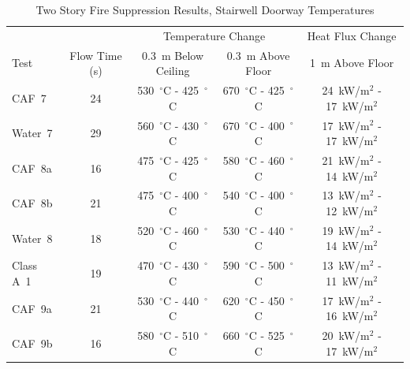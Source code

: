 \documentclass[12pt,oneside]{book}
\begin{document}
\begin{table}[!ht]
\centering
\caption{Two Story Fire Suppression Results, Stairwell Doorway Temperatures}\label{tab:Test_Results_2}
\begin{tabular}{lcccc}
\toprule[1.5pt]
           &               & \multicolumn{2}{c}{Temperature Change}                                    & Heat Flux Change \\
Test 	   & Flow Time (s) & 0.3~m Below Ceiling                 & 0.3~m Above Floor	               & 1~m Above Floor \\
\midrule
CAF~7      & 24            & 530~$^{\circ}$C - 425~$^{\circ}$C   & 670~$^{\circ}$C - 425~$^{\circ}$C   & 24~kW/m$^2$ - 17~kW/m$^2$  \\[.25cm]
Water~7    & 29            & 560~$^{\circ}$C - 430~$^{\circ}$C   & 670~$^{\circ}$C - 400~$^{\circ}$C   & 17~kW/m$^2$ - 17~kW/m$^2$  \\[.25cm]
CAF~8a     & 16            & 475~$^{\circ}$C - 425~$^{\circ}$C   & 580~$^{\circ}$C - 460~$^{\circ}$C   & 21~kW/m$^2$ - 14~kW/m$^2$  \\
CAF~8b     & 21            & 475~$^{\circ}$C - 400~$^{\circ}$C   & 540~$^{\circ}$C - 400~$^{\circ}$C   & 13~kW/m$^2$ - 12~kW/m$^2$  \\[.25cm]
Water~8    & 18            & 520~$^{\circ}$C - 460~$^{\circ}$C   & 530~$^{\circ}$C - 440~$^{\circ}$C   & 19~kW/m$^2$ - 14~kW/m$^2$  \\[.25cm]
Class A~1  & 19            & 470~$^{\circ}$C - 430~$^{\circ}$C   & 590~$^{\circ}$C - 500~$^{\circ}$C   & 13~kW/m$^2$ - 11~kW/m$^2$  \\
CAF~9a     & 21            & 530~$^{\circ}$C - 440~$^{\circ}$C   & 620~$^{\circ}$C - 450~$^{\circ}$C   & 17~kW/m$^2$ - 16~kW/m$^2$  \\
CAF~9b     & 16            & 580~$^{\circ}$C - 510~$^{\circ}$C   & 660~$^{\circ}$C - 525~$^{\circ}$C   & 20~kW/m$^2$ - 17~kW/m$^2$  \\
\bottomrule[1.25pt]
\end{tabular}\par
\end{table}
\end{document}
